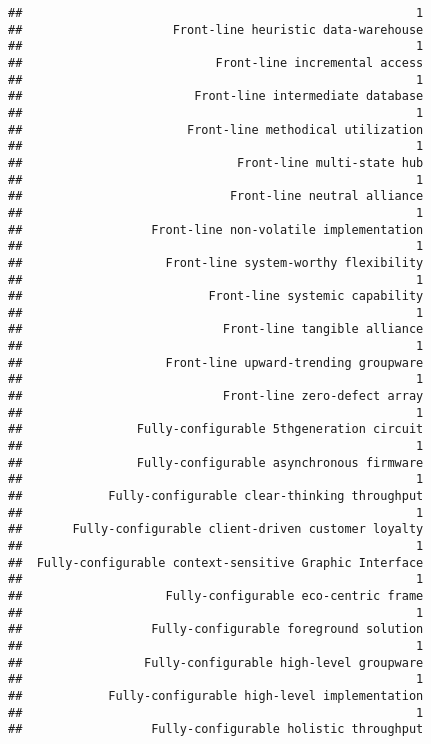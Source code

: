 \documentclass[
]{article}
\begin{document}
\begin{verbatim}
##                                                       1 
##                     Front-line heuristic data-warehouse 
##                                                       1 
##                           Front-line incremental access 
##                                                       1 
##                        Front-line intermediate database 
##                                                       1 
##                       Front-line methodical utilization 
##                                                       1 
##                              Front-line multi-state hub 
##                                                       1 
##                             Front-line neutral alliance 
##                                                       1 
##                  Front-line non-volatile implementation 
##                                                       1 
##                    Front-line system-worthy flexibility 
##                                                       1 
##                          Front-line systemic capability 
##                                                       1 
##                            Front-line tangible alliance 
##                                                       1 
##                    Front-line upward-trending groupware 
##                                                       1 
##                            Front-line zero-defect array 
##                                                       1 
##                Fully-configurable 5thgeneration circuit 
##                                                       1 
##                Fully-configurable asynchronous firmware 
##                                                       1 
##            Fully-configurable clear-thinking throughput 
##                                                       1 
##       Fully-configurable client-driven customer loyalty 
##                                                       1 
##  Fully-configurable context-sensitive Graphic Interface 
##                                                       1 
##                    Fully-configurable eco-centric frame 
##                                                       1 
##                  Fully-configurable foreground solution 
##                                                       1 
##                 Fully-configurable high-level groupware 
##                                                       1 
##            Fully-configurable high-level implementation 
##                                                       1 
##                  Fully-configurable holistic throughput 

\end{verbatim}
\end{document}

